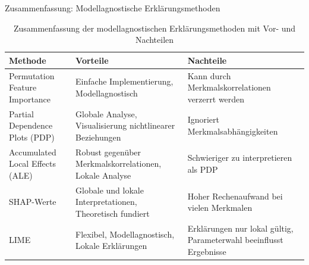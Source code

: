 \documentclass[aspectratio=1610, xcolor=dvipsnames, 9pt]{beamer}
\begin{document}
\begin{frame}{Zusammenfassung: Modellagnostische Erklärungsmethoden}
  \begin{table}[]
    \centering
    \begin{tabular}{|p{3cm}|p{4cm}|p{4cm}|}
      \hline
      \textbf{Methode} & \textbf{Vorteile} & \textbf{Nachteile} \\ \hline
      Permutation Feature Importance & 
      Einfache Implementierung, Modellagnostisch & 
      Kann durch Merkmalskorrelationen verzerrt werden \\ \hline
      Partial Dependence Plots (PDP) & 
      Globale Analyse, Visualisierung nichtlinearer Beziehungen & 
      Ignoriert Merkmalsabhängigkeiten \\ \hline
      Accumulated Local Effects (ALE) & 
      Robust gegenüber Merkmalskorrelationen, Lokale Analyse & 
      Schwieriger zu interpretieren als PDP \\ \hline
      SHAP-Werte & 
      Globale und lokale Interpretationen, Theoretisch fundiert & 
      Hoher Rechenaufwand bei vielen Merkmalen \\ \hline
      LIME & 
      Flexibel, Modellagnostisch, Lokale Erklärungen & 
      Erklärungen nur lokal gültig, Parameterwahl beeinflusst Ergebnisse \\ \hline
    \end{tabular}
    \caption{Zusammenfassung der modellagnostischen Erklärungsmethoden mit Vor- und Nachteilen}
  \end{table}
\end{frame}
\end{document}
